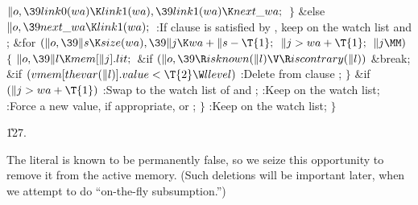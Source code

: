 ${}\|o,\39\\{link0}(\\{wa})\K\\{link1}(\\{wa}),\39\\{link1}(\\{wa})\K\\{next%
\_wa};{}$\6
\4${}\}{}$\5
\2\&{else}\1\5
${}\|o,\39\\{next\_wa}\K\\{link1}(\\{wa});{}$\2\6
:If clause  is satisfied by , keep  on the
watch list and \X;\6
\&{for} ${}(\|o,\39\|s\K\\{size}(\\{wa}),\39\|j\K\\{wa}+\|s-\T{1};{}$ ${}\|j>%
\\{wa}+\T{1};{}$ ${}\|j\MM){}$\5
${}\{{}$\1\6
${}\|o,\39\|l\K\\{mem}[\|j].\\{lit};{}$\6
\&{if} ${}(\|o,\39\R\\{isknown}(\|l)\V\R\\{iscontrary}(\|l)){}$\1\5
\&{break};\2\6
\&{if} ${}(\\{vmem}[\\{thevar}(\|l)].\\{value}<\T{2}\W\\{llevel}){}$\1\5
:Delete  from clause \X;\2\6
\4${}\}{}$\2\6
\&{if} ${}(\|j>\\{wa}+\T{1}){}$\1\5
:Swap  to the watch list of  and \X;\2\6
:Keep  on the watch list\X;\6
:Force a new value, if appropriate, or \X;\6
\4${}\}{}$\2\6
:Keep  on the watch list\X;\6
\4${}\}{}$\2\par
\U127.\fi

The literal  is known to be permanently false, so
we seize this
opportunity to remove it from the active memory. (Such deletions will
be important later, when we attempt to do ``on-the-fly subsumption.'')

